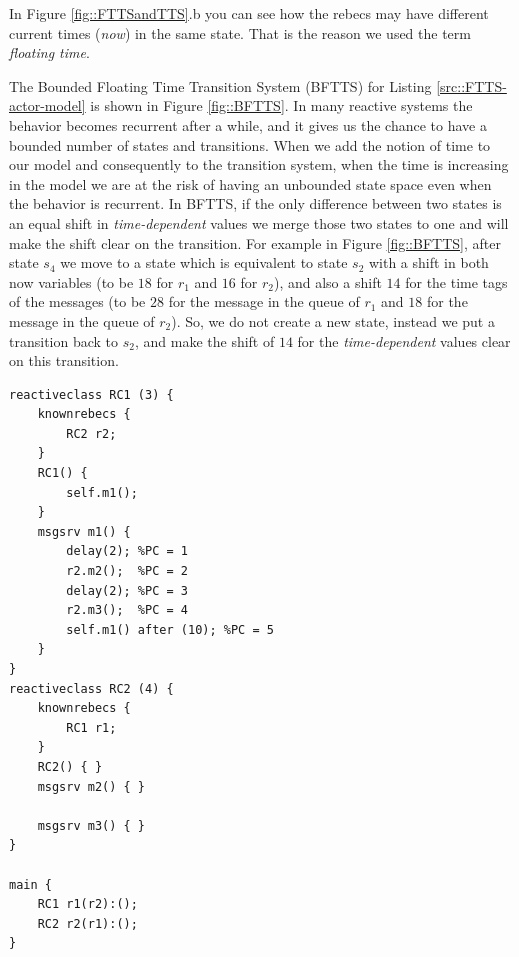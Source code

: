 In Figure \ref{fig::FTTSandTTS}.b you can see how the rebecs may have different current times (\textit{now}) in the same state. That is the reason we used the term \textit{floating time}. 

The Bounded Floating Time Transition System (BFTTS) for Listing \ref{src::FTTS-actor-model} is shown in Figure \ref{fig::BFTTS}. 
In many reactive systems the behavior becomes recurrent after a while, and it gives us the chance to have a bounded number of states and transitions. When we add the notion of time to our model and consequently to the transition system, when the time is increasing in the model we are at the risk of having an unbounded state space even when the behavior is recurrent.
In BFTTS, if the only difference between two states is an equal shift in \textit{time-dependent} values we merge those two states to one and will make the shift clear on the transition.
For example in Figure \ref{fig::BFTTS}, after state $s_4$ we move to a state which is equivalent to state $s_2$ with a shift in both now variables (to be $18$ for $r_1$  and $16$ for $r_2$), and also a shift $14$ for the time tags of the messages (to be $28$ for the message in the queue of $r_1$ and $18$ for the message in the queue of $r_2$). So, we do not create a new state, instead we put a transition back to $s_2$, and make the shift of $14$ for the \textit{time-dependent} values clear on this transition.



\begin{lstlisting}[language=rebeca, caption= A simple Timed Rebeca model with two rebecs, label=src::FTTS-actor-model]
reactiveclass RC1 (3) {
	knownrebecs {
		RC2 r2;
	}
	RC1() {
		self.m1();
	}
	msgsrv m1() {
		delay(2); %PC = 1
		r2.m2();  %PC = 2 
		delay(2); %PC = 3 
		r2.m3();  %PC = 4
		self.m1() after (10); %PC = 5
	}
}
reactiveclass RC2 (4) {
	knownrebecs {
		RC1 r1;
	}
	RC2() { }
	msgsrv m2() { }
	
	msgsrv m3() { }
}

main {
	RC1 r1(r2):();
	RC2 r2(r1):();
}

\end{lstlisting}

